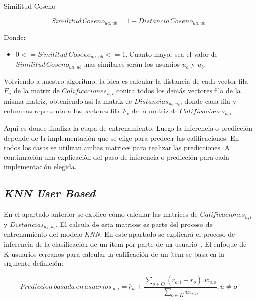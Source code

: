\documentclass[11pt,a4paper,twoside]{thesis}
\begin{document}
\clearpage
\begin{description}
	\item[Similitud Coseno]
\end{description}
\begin{equation}
	Similitud \mspace{3mu}Coseno_{ua, ub} = 1- Distancia \mspace{3mu}Coseno_{ua, ub}
\end{equation}
\begin{description}
	\item[Donde:]
\end{description}
\begin{itemize}
	\item $0 <= Similitud \mspace{3mu}Coseno_{ua, ub} <= 1$. Cuanto mayor sea el valor de $Similitud \mspace{3mu}Coseno_{ua, ub}$ mas similares serán los usuarios $u_a$ y $u_b$.
\end{itemize}

Volviendo a nuestro algoritmo, la idea es calcular la distancia de cada vector
fila $F_u$ de la matriz de $Calificaciones_{u,i}$ contra todos los demás
vectores fila de la misma matriz, obteniendo asi la matriz de
$Distancias_{u_a,u_b}$, donde cada fila y columnas representa a los vectores
fila $F_u$ de la matriz de $Calificaciones_{u,i}$.

Aquí es donde finaliza la etapa de entrenamiento. Luego la inferencia o
predicción depende de la implementación que se elige para predecir las
calificaciones. En todos los casos se utilizan ambas matrices para realizar las
predicciones. A continuación una explicación del paso de inferencia o
predicción para cada implementación elegida.

\clearpage

\subsection{\textit{KNN User Based}}

En el apartado anterior se explico cómo calcular las matrices de
$Calificaciones_{u,i}$ y $Distancias_{u_a,u_b}$. El calcula de esta matrices es
parte del proceso de entrenamiento del modelo \textit{KNN}. En este apartado se
explicará el proceso de inferencia de la clasificación de un ítem por parte de
un usuario~\cite{useritembasedinference}. El enfoque de K usuarios cercanos
para calcular la calificación de un ítem se basa en la siguiente definición:

\begin{equation}
	Prediccion \mspace{3mu}basada \mspace{3mu}en \mspace{3mu}usuarios\mspace{3mu}_{u, i} = \overline{r}_{u} + \frac{\sum_{o \in O} (r_{o, i} - \overline{r}_o) . w_{u, o} }{ \sum_{o \in K} w_{u, o}}, u \neq o
\end{equation}
\end{document}
